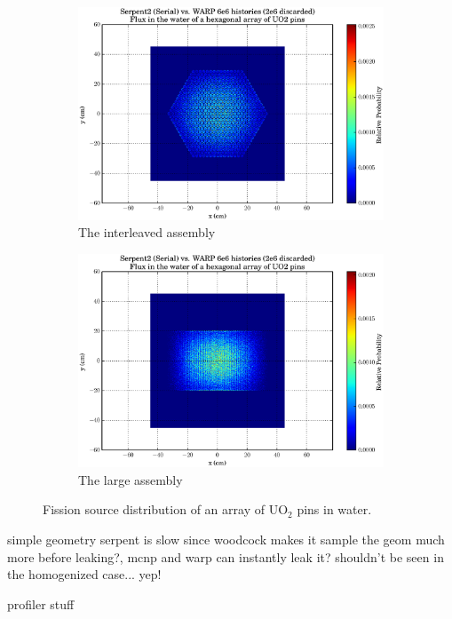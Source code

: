 \begin{figure}[h!]
\centering
\begin{subfigure}{.5\textwidth}
  \centering
  \includegraphics[width=\linewidth]{graphics/finalresults/assembly_fiss1.eps}
  \caption{The interleaved assembly}
  \label{fig:sub1}
\end{subfigure}%
\begin{subfigure}{.5\textwidth}
  \centering
  \includegraphics[width=\linewidth]{graphics/finalresults/assembly_fiss2.eps}
  \caption{The large assembly}
  \label{fig:sub2}
\end{subfigure}
\caption{Fission source distribution of an array of UO$_2$ pins in water. \label{assembly_fiss} }
\end{figure}



simple geometry serpent is slow since woodcock makes it sample the geom much more before leaking?, mcnp and warp can instantly leak it?  shouldn't be seen in the homogenized case... yep!


profiler stuff

